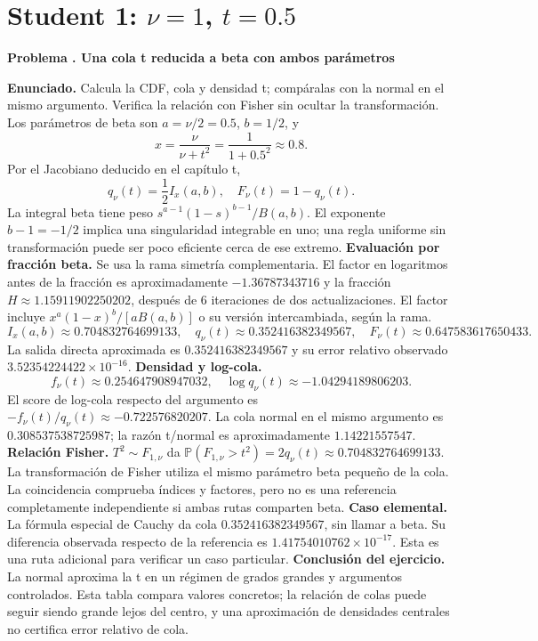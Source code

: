 \documentclass[11pt,a4paper]{article}
\newcommand{\Prob}{\mathbb P}
\theoremstyle{definition}
\newcounter{problema}
\newenvironment{resuelto}[1]{\refstepcounter{problema}\par\medskip\Needspace{6\baselineskip}\textbf{Problema \theproblema. #1}\par}{\par\medskip}
\begin{document}
\section{\texorpdfstring{Student 1: $\nu=1$, $t=0.5$}{Student 1: nu=1, t=0.5}}
\begin{resuelto}{Una cola t reducida a beta con ambos parámetros}
\textbf{Enunciado.} Calcula la CDF, cola y densidad t; compáralas con la normal en el mismo argumento. Verifica la relación con Fisher sin ocultar la transformación.
Los parámetros de beta son $a=\nu/2=0.5$, $b=1/2$, y
\[
x=\frac{\nu}{\nu+t^2}=\frac{1}{1+0.5^2}\approx0.8.
\]
Por el Jacobiano deducido en el capítulo t,
\[
q_\nu(t)=\frac12 I_x(a,b),\quad F_\nu(t)=1-q_\nu(t).
\]
La integral beta tiene peso $s^{a-1}(1-s)^{b-1}/B(a,b)$. El exponente $b-1=-1/2$ implica una singularidad integrable en uno; una regla uniforme sin transformación puede ser poco eficiente cerca de ese extremo.
\textbf{Evaluación por fracción beta.} Se usa la rama simetría complementaria. El factor en logaritmos antes de la fracción es aproximadamente $-1.36787343716$ y la fracción $H\approx1.15911902250202$, después de 6 iteraciones de dos actualizaciones. El factor incluye $x^a(1-x)^b/[aB(a,b)]$ o su versión intercambiada, según la rama.
\[
I_x(a,b)\approx0.704832764699133,\quad q_\nu(t)\approx0.352416382349567,\quad F_\nu(t)\approx0.647583617650433.
\]
La salida directa aproximada es $0.352416382349567$ y su error relativo observado $3.52354224422\times10^{-16}$.
\textbf{Densidad y log-cola.}
\[
f_\nu(t)\approx0.254647908947032,\quad
\log q_\nu(t)\approx-1.04294189806203.
\]
El score de log-cola respecto del argumento es $-f_\nu(t)/q_\nu(t)\approx-0.722576820207$. La cola normal en el mismo argumento es $0.308537538725987$; la razón t/normal es aproximadamente $1.14221557547$.
\textbf{Relación Fisher.} $T^2\sim F_{1,\nu}$ da $\Prob(F_{1,\nu}>t^2)=2q_\nu(t)\approx0.704832764699133$. La transformación de Fisher utiliza el mismo parámetro beta pequeño de la cola. La coincidencia comprueba índices y factores, pero no es una referencia completamente independiente si ambas rutas comparten beta.
\textbf{Caso elemental.} La fórmula especial de Cauchy da cola $0.352416382349567$, sin llamar a beta. Su diferencia observada respecto de la referencia es $1.41754010762\times10^{-17}$. Esta es una ruta adicional para verificar un caso particular.
\textbf{Conclusión del ejercicio.} La normal aproxima la t en un régimen de grados grandes y argumentos controlados. Esta tabla compara valores concretos; la relación de colas puede seguir siendo grande lejos del centro, y una aproximación de densidades centrales no certifica error relativo de cola.
\end{resuelto}
\end{document}

